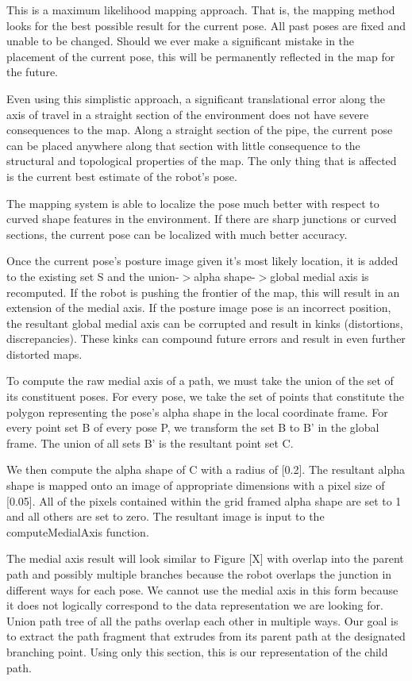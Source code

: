 This is a maximum likelihood mapping approach. That is, the mapping method looks for the best possible result for the current pose. All past poses are fixed and unable to be changed. Should we ever make a significant mistake in the placement of the current pose, this will be permanently reflected in the map for the future.

Even using this simplistic approach, a significant translational error along the axis of travel in a straight section of the environment does not have severe consequences to the map. Along a straight section of the pipe, the current pose can be placed anywhere along that section with little consequence to the structural and topological properties of the map. The only thing that is affected is the current best estimate of the robot's pose.

The mapping system is able to localize the pose much better with respect to curved shape features in the environment. If there are sharp junctions or curved sections, the current pose can be localized with much better accuracy.

Once the current pose's posture image given it's most likely location, it is added to the existing set S and the union-$>$alpha shape-$>$global medial axis is recomputed. If the robot is pushing the frontier of the map, this will result in an extension of the medial axis. If the posture image pose is an incorrect position, the resultant global medial axis can be corrupted and result in kinks (distortions, discrepancies). These kinks can compound future errors and result in even further distorted maps.

To compute the raw medial axis of a path, we must take the union of the set of its constituent poses. For every pose, we take the set of points that constitute the polygon representing the pose's alpha shape in the local coordinate frame. For every point set B of every pose P, we transform the set B to B' in the global frame. The union of all sets B' is the resultant point set C.

We then compute the alpha shape of C with a radius of [0.2]. The resultant alpha shape is mapped onto an image of appropriate dimensions with a pixel size of [0.05]. All of the pixels contained within the grid framed alpha shape are set to 1 and all others are set to zero. The resultant image is input to the computeMedialAxis function.

The medial axis result will look similar to Figure [X] with overlap into the parent path and possibly multiple branches because the robot overlaps the junction in different ways for each pose. We cannot use the medial axis in this form because it does not logically correspond to the data representation we are looking for. Union path tree of all the paths overlap each other in multiple ways. Our goal is to extract the path fragment that extrudes from its parent path at the designated branching point. Using only this section, this is our representation of the child path.


